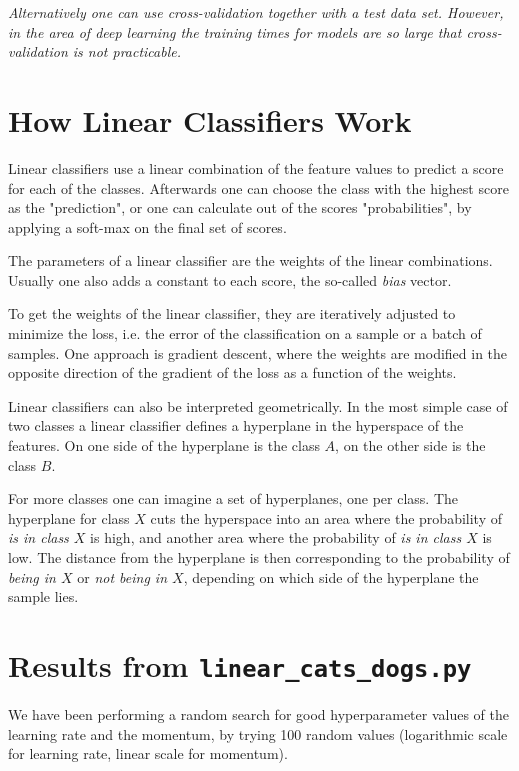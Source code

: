 \documentclass[sigconf,nonacm]{acmart}
\begin{document}
\emph{Alternatively one can use cross-validation together with a test data set.
However, in the area of deep learning the training times for models are so
large that cross-validation is not practicable.}

\section{How Linear Classifiers Work}

Linear classifiers use a linear combination of the feature values
to predict a score for each of the classes.
Afterwards one can choose the class with the highest score
as the "prediction", or one can calculate out of the scores
"probabilities", by applying a soft-max on the final set of scores.

The parameters of a linear classifier are the weights of the linear
combinations.
Usually one also adds a constant to each score, the so-called \emph{bias}
vector.

To get the weights of the linear classifier, they are iteratively
adjusted to minimize the loss, i.e. the error of the classification
on a sample or a batch of samples.
One approach is gradient descent, where the weights are modified
in the opposite direction of the gradient of the loss as a function
of the weights.

Linear classifiers can also be interpreted geometrically.
In the most simple case of two classes a linear classifier defines
a hyperplane in the hyperspace of the features.
On one side of the hyperplane is the class $A$,
on the other side is the class $B$.

For more classes one can imagine a set of hyperplanes, one per class.
The hyperplane for class $X$ cuts the hyperspace into an area
where the probability of \emph{is in class $X$} is high,
and another area where the probability of \emph{is in class $X$}
is low.
The distance from the hyperplane is then corresponding to the
probability of \emph{being in $X$} or \emph{not being in $X$},
depending on which side of the hyperplane the sample lies.

\section{Results from \texttt{linear\_cats\_dogs.py}}
We have been performing a random search for good hyperparameter
values of the learning rate and the momentum, by trying 100 random
values (logarithmic scale for learning rate, linear scale for momentum).
\end{document}
